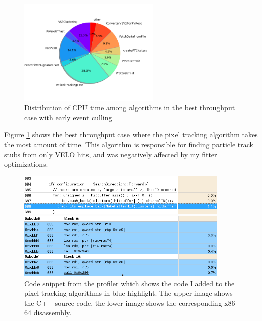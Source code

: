 \documentclass[12pt]{article}
\begin{document}
\begin{figure}[H]
	\begin{center}
		\includegraphics[width=0.6\textwidth]{algo_usage_original_bestthru}
	\end{center}
	\caption{Distribution of CPU time among algorithms in the best throughput case with early event culling}
	\label{fig_algo_usage_original_bestthru}
\end{figure}

Figure \ref{fig_algo_usage_original_bestthru} shows the best throughput case where the pixel tracking algorithm takes the most amount of time. This algorithm is responsible for finding particle track stubs from only VELO hits, and was negatively affected by my fitter optimizations.

\begin{figure}[H]
	\begin{center}
		\includegraphics[width=0.9\textwidth]{kalmanfit_disasm_opt_src_naive}
	\end{center}
	\begin{center}
		\includegraphics[width=0.9\textwidth]{kalmanfit_disasm_opt_asm_naive}
	\end{center}
	\caption[Undesired code growth from the fitter optimization]{Code snippet from the profiler which shows the code I added to the pixel tracking algorithms in blue highlight. The upper image shows the C++ source code, the lower image shows the corresponding x86-64 disassembly.}
	\label{fig_kalman_disasm_src_naive}
\end{figure}
\end{document}

